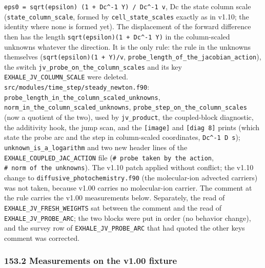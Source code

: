 \documentclass[english,a4paper]{my_memo}
\begin{document}
\texttt{eps0\ =\ sqrt(epsilon)\ (1\ +\ \textbar{}\textbar{}Dc\^{}-1\ Y\textbar{}\textbar{})\ /\ \textbar{}\textbar{}Dc\^{}-1\ v\textbar{}\textbar{}}, Dc the state column scale (\texttt{state\_column\_scale}, formed by \texttt{cell\_state\_scales} exactly as in v1.10; the identity where none is formed yet). The displacement of the forward difference then has the length \texttt{sqrt(epsilon)(1\ +\ \textbar{}\textbar{}Dc\^{}-1\ Y\textbar{}\textbar{})} in the column-scaled unknowns whatever the direction. It is the only rule: the rule in the unknowns themselves (\texttt{sqrt(epsilon)(1\ +\ \textbar{}\textbar{}Y\textbar{}\textbar{})/\textbar{}\textbar{}v\textbar{}\textbar{}}, \texttt{probe\_length\_of\_the\_jacobian\_action}), the switch \texttt{jv\_probe\_on\_the\_column\_scales} and its key \texttt{EXHALE\_JV\_COLUMN\_SCALE} were deleted. \texttt{src/modules/time\_step/steady\_newton.f90}: \texttt{probe\_length\_in\_the\_column\_scaled\_unknowns}, \texttt{norm\_in\_the\_column\_scaled\_unknowns}, \texttt{probe\_step\_on\_the\_column\_scales} (now a quotient of the two), used by \texttt{jv\_product}, the coupled-block diagnostic, the additivity hook, the jump scan, and the \texttt{{[}image{]}} and \texttt{{[}diag\ 8{]}} prints (which state the probe arc and the step in column-scaled coordinates, \texttt{\textbar{}\textbar{}Dc\^{}-1\ D\ s\textbar{}\textbar{}}); \texttt{unknown\_is\_a\_logarithm} and two new header lines of the \texttt{EXHALE\_COUPLED\_JAC\_ACTION} file (\texttt{\#\ probe\ taken\ by\ the\ action}, \texttt{\#\ norm\ of\ the\ unknowns}). The v1.10 patch applied without conflict; the v1.10 change to \texttt{diffusive\_photochemistry.f90} (the molecular-ion advected carriers) was not taken, because v1.00 carries no molecular-ion carrier. The comment at the rule carries the v1.00 measurements below. Separately, the read of \texttt{EXHALE\_JV\_FRESH\_WEIGHTS} sat between the comment and the read of \texttt{EXHALE\_JV\_PROBE\_ARC}; the two blocks were put in order (no behavior change), and the survey row of \texttt{EXHALE\_JV\_PROBE\_ARC} that had quoted the other key\textquotesingle s comment was corrected.

\subsubsection{153.2 Measurements on the v1.00 fixture}\label{1532-measurements-on-the-v100-fixture}
\end{document}

